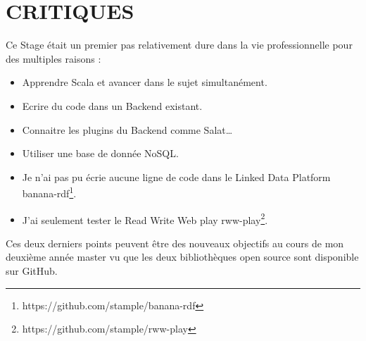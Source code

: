 \chapter{CRITIQUES}

Ce Stage était un premier pas relativement dure dans la vie professionnelle pour des multiples raisons :
\begin{itemize}
\item Apprendre Scala et avancer dans le sujet simultanément.

\item Ecrire du code dans un Backend existant.

\item Connaitre les plugins du Backend comme Salat…

\item Utiliser une base de donnée NoSQL.

\item Je n'ai pas pu écrie aucune ligne de code dans le Linked Data Platform banana-rdf\footnote{https://github.com/stample/banana-rdf}.

\item J'ai seulement tester le Read Write Web play rww-play\footnote{https://github.com/stample/rww-play}.


\end{itemize}

Ces deux derniers points peuvent être des nouveaux objectifs au cours de mon deuxième année master vu que les deux bibliothèques open source sont disponible sur GitHub.  
